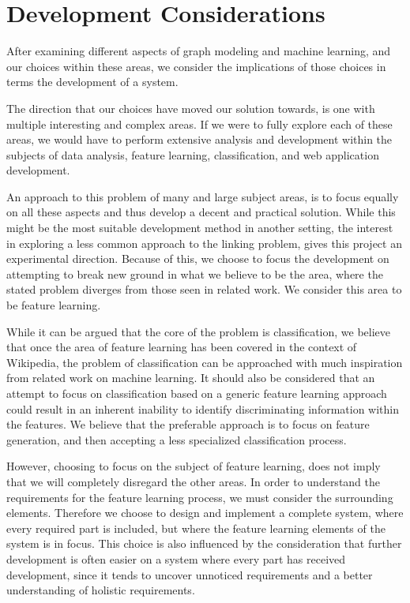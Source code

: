 \section{Development Considerations}

After examining different aspects of graph modeling and machine learning, and our choices within these areas, we consider the implications of those choices in terms the development of a system.

The direction that our choices have moved our solution towards, is one with multiple interesting and complex areas. If we were to fully explore each of these areas, we would have to perform extensive analysis and development within the subjects of data analysis, feature learning, classification, and web application development.

An approach to this problem of many and large subject areas, is to focus equally on all these aspects and thus develop a decent and practical solution. While this might be the most suitable development method in another setting, the interest in exploring a less common approach to the linking problem, gives this project an experimental direction. Because of this, we choose to focus the development on attempting to break new ground in what we believe to be the area, where the stated problem diverges from those seen in related work. We consider this area to be feature learning. 

While it can be argued that the core of the problem is classification, we believe that once the area of feature learning has been covered in the context of Wikipedia, the problem of classification can be approached with much inspiration from related work on machine learning. It should also be considered that an attempt to focus on classification based on a generic feature learning approach could result in an inherent inability to identify discriminating information within the features. We believe that the preferable approach is to focus on feature generation, and then accepting a less specialized classification process.

However, choosing to focus on the subject of feature learning, does not imply that we will completely disregard the other areas. In order to understand the requirements for the feature learning process, we must consider the surrounding elements. Therefore we choose to design and implement a complete system, where every required part is included, but where the feature learning elements of the system is in focus. This choice is also influenced by the consideration that further development is often easier on a system where every part has received development, since it tends to uncover unnoticed requirements and a better understanding of holistic requirements.